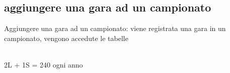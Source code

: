 \documentclass[a4paper,12pt]{report}
\begin{document}
			\subsection{aggiungere una gara ad un campionato}
			Aggiungere una gara ad un campionato:
			viene registrata una gara in un campionato, vengono accedute le tabelle
			\begin{table}[!htb]
				\centering
				\begin{center}
				\newline\\
				2L + 1S = 240 ogni anno\\
				\end{center}
			\end{table}\\
\end{document}
